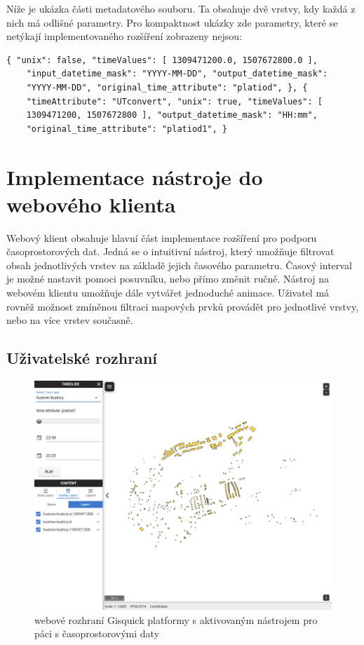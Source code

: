 \newpage
\bigskip
\noindent

Níže je ukázka části metadatového souboru. Ta obsahuje dvě vrstvy, kdy
každá z nich má odlišné parametry. Pro kompaktnost ukázky zde
parametry, které se netýkají implementovaného rozšíření zobrazeny
nejsou:

\begin{verbatim}
{ "unix": false, "timeValues": [ 1309471200.0, 1507672800.0 ],
	"input_datetime_mask": "YYYY-MM-DD", "output_datetime_mask":
	"YYYY-MM-DD", "original_time_attribute": "platiod", }, {
	"timeAttribute": "UTconvert", "unix": true, "timeValues": [
	1309471200, 1507672800 ], "output_datetime_mask": "HH:mm",
	"original_time_attribute": "platiod1", }
\end{verbatim}

\newpage
\section{Implementace nástroje do webového klienta}
Webový klient obsahuje hlavní část implementace rozšíření pro podporu
časoprostorových dat. Jedná se o intuitivní nástroj, který umožňuje
filtrovat obsah jednotlivých vrstev na základě jejich časového
parametru. Časový interval je možné nastavit pomoci posuvníku, nebo
přímo změnit ručně. Nástroj na webovém klientu umožňuje dále vytvářet
jednoduché animace. Uživatel má rovněž možnost zmíněnou filtraci
mapových prvků provádět pro jednotlivé vrstvy, nebo na více vrstev
současně.

\subsection{Uživatelské rozhraní}

\begin{figure}[h!]
	\centering \includegraphics[width=1\textwidth]{../img/gisquick-time-tool.png} \caption{webové
	rozhraní Gisquick platformy s aktivovaným nástrojem pro páci s
	časoprostorovými daty} \label{fig:arcgis-time-settings}
\end{figure}

